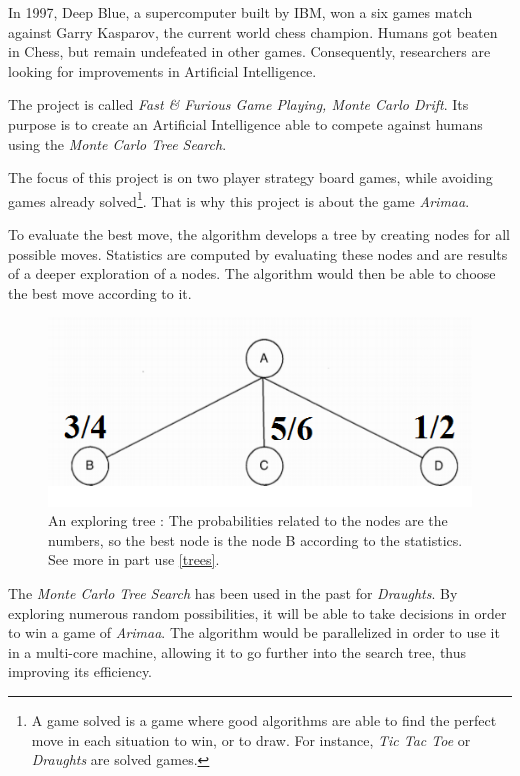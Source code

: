 
In 1997, Deep Blue, a supercomputer built by IBM, won a six games match against Garry Kasparov, the current world chess champion. Humans got beaten in Chess, but remain undefeated in other games. Consequently, researchers are looking for improvements in Artificial Intelligence.
\newline

The project is called \emph{Fast \& Furious Game Playing, Monte Carlo Drift}. Its purpose is to create an Artificial Intelligence able to compete against humans using the \emph{Monte Carlo Tree Search}.
\newline

The focus of this project is on two player strategy board games, while avoiding games already solved\footnote{A game solved is a game where good algorithms are able to find the perfect move in each situation to win, or to draw. For instance, \textit{Tic Tac Toe} or \textit{Draughts} are solved games.}. That is why this project is about the game \emph{Arimaa}.
\newline

To evaluate the best move, the algorithm develops a tree by creating nodes for all possible moves. Statistics are computed by evaluating these nodes and are results of a deeper exploration of a nodes. The algorithm would then be able to choose the best move according to it.
\smallbreak
\begin{figure}[!h] 
\centerline{\includegraphics[scale=0.75]{1_Presentation/1.1_Our_project_Dan/tree}}
  \caption{An exploring tree : \newline The probabilities related to the nodes are the numbers, so the best node is the node B according to the statistics. See more in part  use \ref{trees}.} %
  \centering
\end{figure}
The \emph{Monte Carlo Tree Search} has been used in the past for \textit{Draughts}. By exploring numerous random possibilities, it will be able to take decisions in order to win a game of \emph{Arimaa}.
The algorithm would be parallelized in order to use it in a multi-core machine, allowing it to go further into the search tree, thus improving its efficiency.
\newline

